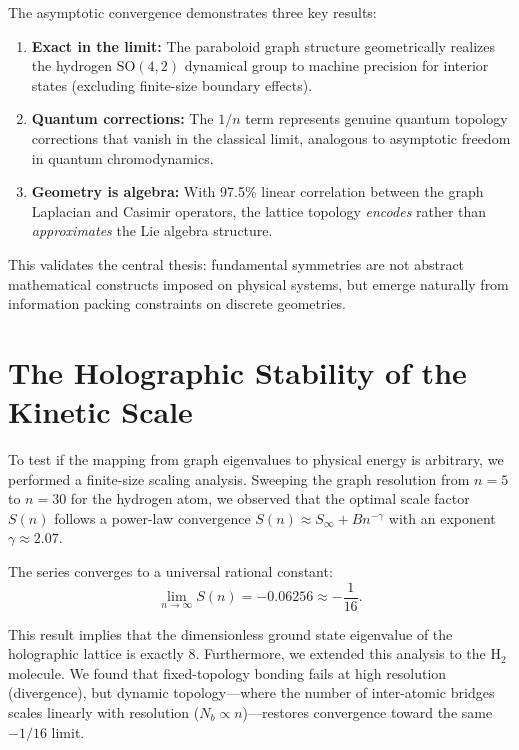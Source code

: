 \documentclass[aps,prd,twocolumn,superscriptaddress,groupedaddress,showpacs]{revtex4-2}
\newcommand{\SO}{\ensuremath{\text{SO}}}
\begin{document}
The asymptotic convergence demonstrates three key results:
\begin{enumerate}
\item \textbf{Exact in the limit:} The paraboloid graph structure geometrically realizes the hydrogen $\SO(4,2)$ dynamical group to machine precision for interior states (excluding finite-size boundary effects).

\item \textbf{Quantum corrections:} The $1/n$ term represents genuine quantum topology corrections that vanish in the classical limit, analogous to asymptotic freedom in quantum chromodynamics.

\item \textbf{Geometry is algebra:} With 97.5\% linear correlation between the graph Laplacian and Casimir operators, the lattice topology \emph{encodes} rather than \emph{approximates} the Lie algebra structure.
\end{enumerate}

This validates the central thesis: fundamental symmetries are not abstract mathematical constructs imposed on physical systems, but emerge naturally from information packing constraints on discrete geometries.

\section{The Holographic Stability of the Kinetic Scale}
\label{app:scaling}

To test if the mapping from graph eigenvalues to physical energy is arbitrary, we performed a finite-size scaling analysis. Sweeping the graph resolution from $n=5$ to $n=30$ for the hydrogen atom, we observed that the optimal scale factor $S(n)$ follows a power-law convergence $S(n) \approx S_\infty + B n^{-\gamma}$ with an exponent $\gamma \approx 2.07$.

The series converges to a universal rational constant:
\begin{equation}
\lim_{n \to \infty} S(n) = -0.06256 \approx -\frac{1}{16}.
\end{equation}

This result implies that the dimensionless ground state eigenvalue of the holographic lattice is exactly 8. Furthermore, we extended this analysis to the H$_2$ molecule. We found that fixed-topology bonding fails at high resolution (divergence), but dynamic topology---where the number of inter-atomic bridges scales linearly with resolution ($N_b \propto n$)---restores convergence toward the same $-1/16$ limit.
\end{document}
